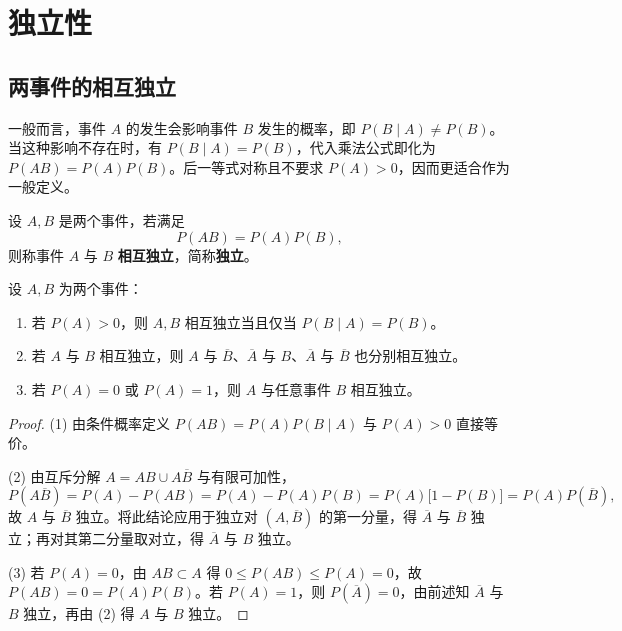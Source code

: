 \section{独立性}
\label{sec:event-independence}

\subsection{两事件的相互独立}

一般而言，事件 $A$ 的发生会影响事件 $B$ 发生的概率，即 $P(B\mid A)\ne P(B)$。当这种影响不存在时，有 $P(B\mid A)=P(B)$，代入乘法公式即化为 $P(AB)=P(A)P(B)$。后一等式对称且不要求 $P(A)>0$，因而更适合作为一般定义。

\begin{definition}[两事件的独立性]
\label{def:two-independence}
设 $A,B$ 是两个事件，若满足
\begin{equation}
  P(AB)=P(A)P(B),
  \label{eq:two-independence}
\end{equation}
则称事件 $A$ 与 $B$ \textbf{相互独立}，简称\textbf{独立}。
\end{definition}

\begin{proposition}[独立性的等价条件与对立保持性]
\label{prop:two-indep-props}
设 $A,B$ 为两个事件：
\begin{enumerate}
  \item 若 $P(A)>0$，则 $A,B$ 相互独立当且仅当 $P(B\mid A)=P(B)$。
  \item 若 $A$ 与 $B$ 相互独立，则 $A$ 与 $\overline{B}$、$\overline{A}$ 与 $B$、$\overline{A}$ 与 $\overline{B}$ 也分别相互独立。
  \item 若 $P(A)=0$ 或 $P(A)=1$，则 $A$ 与任意事件 $B$ 相互独立。
\end{enumerate}
\end{proposition}
\begin{proof}
(1) 由条件概率定义 $P(AB)=P(A)P(B\mid A)$ 与 $P(A)>0$ 直接等价。

(2) 由互斥分解 $A=AB\cup A\overline{B}$ 与有限可加性，
\[
  P(A\overline{B})=P(A)-P(AB)=P(A)-P(A)P(B)=P(A)\bigl[1-P(B)\bigr]=P(A)P(\overline{B}),
\]
故 $A$ 与 $\overline{B}$ 独立。将此结论应用于独立对 $(A,\overline{B})$ 的第一分量，得 $\overline{A}$ 与 $\overline{B}$ 独立；再对其第二分量取对立，得 $\overline{A}$ 与 $B$ 独立。

(3) 若 $P(A)=0$，由 $AB\subset A$ 得 $0\le P(AB)\le P(A)=0$，故 $P(AB)=0=P(A)P(B)$。若 $P(A)=1$，则 $P(\overline{A})=0$，由前述知 $\overline{A}$ 与 $B$ 独立，再由 (2) 得 $A$ 与 $B$ 独立。
\end{proof}

